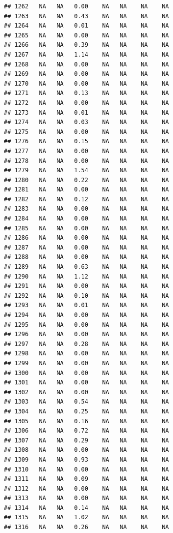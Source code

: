\documentclass{article}\usepackage{graphicx, color}
\makeatletter
\newenvironment{kframe}{%
 \def\at@end@of@kframe{}%
 \ifinner\ifhmode%
  \def\at@end@of@kframe{\end{minipage}}%
  \begin{minipage}{\columnwidth}%
 \fi\fi%
 \def\FrameCommand##1{\hskip\@totalleftmargin \hskip-\fboxsep
 \colorbox{shadecolor}{##1}\hskip-\fboxsep
     \hskip-\linewidth \hskip-\@totalleftmargin \hskip\columnwidth}%
 \MakeFramed {\advance\hsize-\width
   \@totalleftmargin\z@ \linewidth\hsize
   \@setminipage}}%
 {\par\unskip\endMakeFramed%
 \at@end@of@kframe}
\newenvironment{knitrout}{}{} %
\makeatother
\begin{document}
\begin{knitrout}
\begin{kframe}
\begin{verbatim}
## 1262   NA   NA   0.00    NA   NA    NA    NA
## 1263   NA   NA   0.43    NA   NA    NA    NA
## 1264   NA   NA   0.01    NA   NA    NA    NA
## 1265   NA   NA   0.00    NA   NA    NA    NA
## 1266   NA   NA   0.39    NA   NA    NA    NA
## 1267   NA   NA   1.14    NA   NA    NA    NA
## 1268   NA   NA   0.00    NA   NA    NA    NA
## 1269   NA   NA   0.00    NA   NA    NA    NA
## 1270   NA   NA   0.00    NA   NA    NA    NA
## 1271   NA   NA   0.13    NA   NA    NA    NA
## 1272   NA   NA   0.00    NA   NA    NA    NA
## 1273   NA   NA   0.01    NA   NA    NA    NA
## 1274   NA   NA   0.03    NA   NA    NA    NA
## 1275   NA   NA   0.00    NA   NA    NA    NA
## 1276   NA   NA   0.15    NA   NA    NA    NA
## 1277   NA   NA   0.00    NA   NA    NA    NA
## 1278   NA   NA   0.00    NA   NA    NA    NA
## 1279   NA   NA   1.54    NA   NA    NA    NA
## 1280   NA   NA   0.22    NA   NA    NA    NA
## 1281   NA   NA   0.00    NA   NA    NA    NA
## 1282   NA   NA   0.12    NA   NA    NA    NA
## 1283   NA   NA   0.00    NA   NA    NA    NA
## 1284   NA   NA   0.00    NA   NA    NA    NA
## 1285   NA   NA   0.00    NA   NA    NA    NA
## 1286   NA   NA   0.00    NA   NA    NA    NA
## 1287   NA   NA   0.00    NA   NA    NA    NA
## 1288   NA   NA   0.00    NA   NA    NA    NA
## 1289   NA   NA   0.63    NA   NA    NA    NA
## 1290   NA   NA   1.12    NA   NA    NA    NA
## 1291   NA   NA   0.00    NA   NA    NA    NA
## 1292   NA   NA   0.10    NA   NA    NA    NA
## 1293   NA   NA   0.01    NA   NA    NA    NA
## 1294   NA   NA   0.00    NA   NA    NA    NA
## 1295   NA   NA   0.00    NA   NA    NA    NA
## 1296   NA   NA   0.00    NA   NA    NA    NA
## 1297   NA   NA   0.28    NA   NA    NA    NA
## 1298   NA   NA   0.00    NA   NA    NA    NA
## 1299   NA   NA   0.00    NA   NA    NA    NA
## 1300   NA   NA   0.00    NA   NA    NA    NA
## 1301   NA   NA   0.00    NA   NA    NA    NA
## 1302   NA   NA   0.00    NA   NA    NA    NA
## 1303   NA   NA   0.54    NA   NA    NA    NA
## 1304   NA   NA   0.25    NA   NA    NA    NA
## 1305   NA   NA   0.16    NA   NA    NA    NA
## 1306   NA   NA   0.72    NA   NA    NA    NA
## 1307   NA   NA   0.29    NA   NA    NA    NA
## 1308   NA   NA   0.00    NA   NA    NA    NA
## 1309   NA   NA   0.93    NA   NA    NA    NA
## 1310   NA   NA   0.00    NA   NA    NA    NA
## 1311   NA   NA   0.09    NA   NA    NA    NA
## 1312   NA   NA   0.00    NA   NA    NA    NA
## 1313   NA   NA   0.00    NA   NA    NA    NA
## 1314   NA   NA   0.14    NA   NA    NA    NA
## 1315   NA   NA   1.02    NA   NA    NA    NA
## 1316   NA   NA   0.26    NA   NA    NA    NA

\end{verbatim}
\end{kframe}
\end{knitrout}
\end{document}
